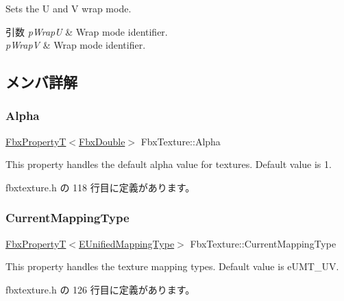 Sets the U and V wrap mode. 
\begin{DoxyParams}{引数}
{\em p\+WrapU} & Wrap mode identifier. \\
\hline
{\em p\+WrapV} & Wrap mode identifier. \\
\hline
\end{DoxyParams}


\subsection{メンバ詳解}
\mbox{\label{class_fbx_texture_a7248e3e31a2739d23c46a1c1a60fd801}} 
\subsubsection{\texorpdfstring{Alpha}{Alpha}}
{\footnotesize\ttfamily \hyperlink{class_fbx_property_t}{Fbx\+PropertyT}$<$\hyperlink{fbxtypes_8h_a171e72a1c46fc15c1a6c9c31948c1c5b}{Fbx\+Double}$>$ Fbx\+Texture\+::\+Alpha}

This property handles the default alpha value for textures. Default value is 1. 

 fbxtexture.\+h の 118 行目に定義があります。

\mbox{\label{class_fbx_texture_a128209af76f914e38438ba56879c0d5c}} 
\subsubsection{\texorpdfstring{Current\+Mapping\+Type}{CurrentMappingType}}
{\footnotesize\ttfamily \hyperlink{class_fbx_property_t}{Fbx\+PropertyT}$<$\hyperlink{class_fbx_texture_a66649699e6cdfe32a40284ed8e1faad3}{E\+Unified\+Mapping\+Type}$>$ Fbx\+Texture\+::\+Current\+Mapping\+Type}

This property handles the texture mapping types. Default value is e\+U\+M\+T\+\_\+\+UV. 

 fbxtexture.\+h の 126 行目に定義があります。

\mbox{\label{class_fbx_texture_a0f0cad13b8b10cfbeb31801b503a60ec}} 
